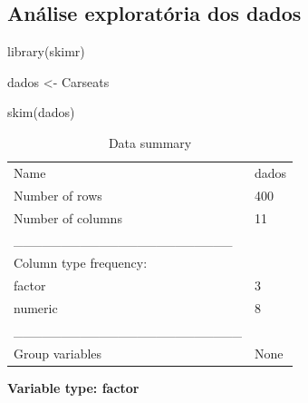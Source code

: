 \documentclass[
  letterpaper,
  DIV=11,
  numbers=noendperiod]{scrartcl}
\newenvironment{Shaded}{\begin{snugshade}}{\end{snugshade}}
\newcommand{\FunctionTok}[1]{\textcolor[rgb]{0.28,0.35,0.67}{#1}}
\newcommand{\NormalTok}[1]{\textcolor[rgb]{0.00,0.23,0.31}{#1}}
\newcommand{\OtherTok}[1]{\textcolor[rgb]{0.00,0.23,0.31}{#1}}
\begin{document}
\subsection{Análise exploratória dos
dados}\label{anuxe1lise-exploratuxf3ria-dos-dados}

\begin{Shaded}
\begin{Highlighting}[]
\FunctionTok{library}\NormalTok{(skimr)}

\NormalTok{dados }\OtherTok{\textless{}{-}}\NormalTok{ Carseats}

\FunctionTok{skim}\NormalTok{(dados)}
\end{Highlighting}
\end{Shaded}

\begin{longtable}[]{@{}ll@{}}
\caption{Data summary}\tabularnewline
\toprule\noalign{}
\endfirsthead
\endhead
\bottomrule\noalign{}
\endlastfoot
Name & dados \\
Number of rows & 400 \\
Number of columns & 11 \\
\_\_\_\_\_\_\_\_\_\_\_\_\_\_\_\_\_\_\_\_\_\_\_ & \\
Column type frequency: & \\
factor & 3 \\
numeric & 8 \\
\_\_\_\_\_\_\_\_\_\_\_\_\_\_\_\_\_\_\_\_\_\_\_\_ & \\
Group variables & None \\
\end{longtable}

\textbf{Variable type: factor}
\end{document}
